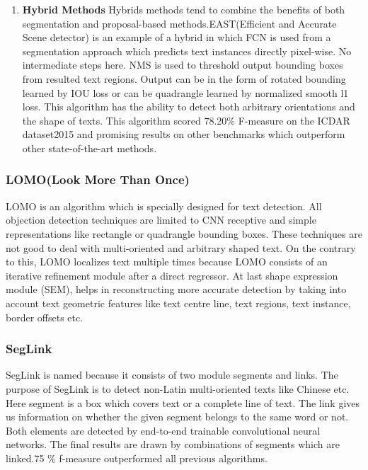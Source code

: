 \begin{enumerate}
    \item \textbf{Hybrid Methods} \newline
    Hybrids methods tend to combine the benefits of both segmentation and proposal-based methods.EAST(Efficient and Accurate Scene detector) is an example of a hybrid in which FCN is used from a segmentation approach which predicts text instances directly pixel-wise. No intermediate steps here. NMS is used to threshold output bounding boxes from resulted text regions. Output can be in the form of rotated bounding learned by IOU loss or can be quadrangle learned by normalized smooth l1 loss. This algorithm has the ability to detect both arbitrary orientations and the shape of texts. This algorithm scored 78.20\% F-measure on the ICDAR dataset2015 and promising results on other benchmarks which outperform other state-of-the-art methods.\cite{zhou2017east} 
\end{enumerate} 

\subsubsection{LOMO(Look More Than Once)}
LOMO \cite{lomo} is an algorithm which is specially designed for text detection. All objection detection techniques are limited to CNN receptive and simple representations like rectangle or quadrangle bounding boxes. These techniques are not good to deal with multi-oriented and arbitrary shaped text. On the contrary to this, LOMO localizes text multiple times because LOMO consists of an iterative refinement module after a direct regressor. At last shape expression module (SEM), helps in reconstructing more accurate detection by taking into account text geometric features like text centre line, text regions, text instance, border offsets etc.

\subsubsection{SegLink}
SegLink \cite{seglink} is named because it consists of two module segments and links. The purpose of SegLink is to detect non-Latin multi-oriented texts like Chinese etc. Here segment is a box which covers text or a complete line of text. The link gives us information on whether the given segment belongs to the same word or not. Both elements are detected by end-to-end trainable convolutional neural networks. The final results are drawn by combinations of segments which are linked.75 \% f-measure outperformed all previous algorithms.

